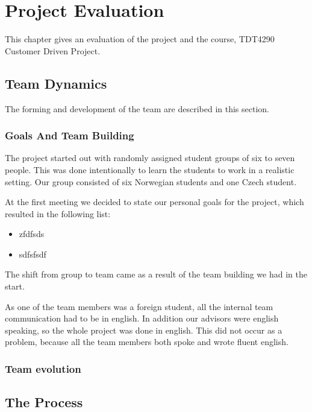 \chapter{Project Evaluation}
This chapter gives an evaluation of the project and the course, TDT4290 Customer Driven Project. 

\section{Team Dynamics}
The forming and development of the team are described in this section.
\subsection{Goals And Team Building}
The project started out with randomly assigned student groups of six to seven people. This was done intentionally to learn the students to work in a realistic setting. Our group consisted of six Norwegian students and one Czech student. 

At the first meeting we decided to state our personal goals for the project, which resulted in the following list:
\begin{itemize}
\item zfdfsds
\item sdfsfsdf
\end{itemize}
The shift from group to team came as a result of the team building we had in the start.  


As one of the team members was a foreign student, all the internal team communication had to be in english. In addition our advisors were english speaking, so the whole project was done in english. This did not occur as a problem, because all the team members both spoke and wrote fluent english.    

\subsection{Team evolution}





\section{The Process}
